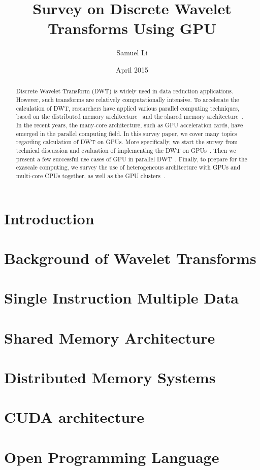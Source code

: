 \documentclass{article}
\title{Survey on Discrete Wavelet Transforms Using GPU}
\author{Samuel Li}
\date{April 2015}
\begin{document}
\onehalfspacing

\maketitle

\begin{abstract}
Discrete Wavelet Transform (DWT) is widely used in data reduction applications.
%
However, such transforms are relatively computationally intensive.
%
To accelerate the calculation of DWT, researchers have applied various parallel
computing techniques, based on the distributed memory architecture~\cite{
chadha2002scalable, nielsen1997scalable}
and the shared memory architecture~\cite{
kutil1999hardware,lucka2000parallel}.
%
In the recent years, the many-core architecture, such as GPU acceleration 
cards, have emerged in the parallel computing field.
%
In this survey paper, we cover many topics regarding calculation of DWT on GPUs.
%
More specifically, we start the survey from technical discussion and evaluation
of implementing the DWT on GPUs~\cite{tenllado2008parallel, van2011accelerating,
garcia2005gpu}.
%
Then we present a few successful use cases of GPU in parallel DWT~\cite{
strengert2004hierarchical, strengert2006pyramid, wong2007discrete,
treib2012turbulence}.
%
Finally, to prepare for the exascale computing, we survey the use of 
heterogeneous architecture with GPUs and multi-core CPUs together,
as well as the GPU clusters~\cite{franco2009parallel, franco2010parallel,
strengert2005large, franco20122d, rossinelli2011multicore}.
%
\end{abstract}

\section{Introduction}

\section{Background of Wavelet Transforms}

\label{sec:bg}

\section{Single Instruction Multiple Data}

\label{sec:simd}

\section{Shared Memory Architecture}

\label{sec:sma}

\section{Distributed Memory Systems}

\label{sec:dma}

\section{CUDA architecture}

\label{sec:cuda}

\section{Open Programming Language}

\label{sec:opencl}

 
%

\end{document}
